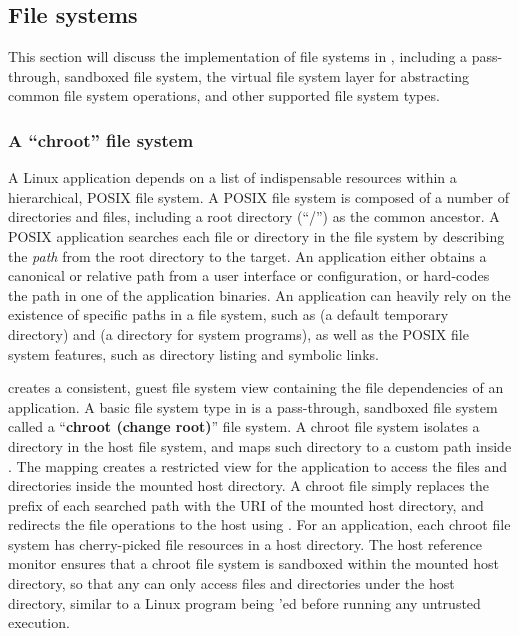\subsection{File systems}
\label{sec:libos:fs}

This section will discuss the implementation of file systems in \thelibos{}, including a pass-through, sandboxed file system, the virtual file system layer for abstracting common file system operations, and other supported file system types.


\subsubsection{A ``chroot'' file system}


A Linux application depends on a list of indispensable resources
within a hierarchical, POSIX file system.
A POSIX file system is composed of a number of directories and files, including a root directory (``/'') as the common ancestor.
A POSIX application searches each file or directory in the file system
by describing the {\em path} %
from the root directory to the target. %
An application either obtains a canonical or relative path
from a user interface or configuration,
or hard-codes the path in one of the application binaries.
An application can heavily rely on the existence of specific paths in a file system,
such as  (a default temporary directory)
and  (a directory for system programs),
as well as the POSIX file system features,
such as directory listing and symbolic links.



\thelibos{} creates a consistent, guest file system view containing the file dependencies of an application.
A basic file system type in \thelibos{} is a pass-through, sandboxed file system called a ``{\bf chroot (change root)}'' file system.
A chroot file system isolates a directory in the host file system,
and maps such directory
to a custom path inside \thelibos{}.
The mapping creates a restricted view for the application to access the files and directories inside the mounted host directory.
A chroot file simply replaces the prefix of each searched path
with the URI of the mounted host directory,
and redirects the file operations to the host using \thehostabi{}.
For an application, each chroot file system has cherry-picked
file resources in a host directory.
The host reference monitor ensures that
a chroot file system 
is sandboxed within the mounted host directory,
so that any \hostapis{} can only access files and directories under the host directory,
similar to a Linux program being 'ed
before running any untrusted execution.


